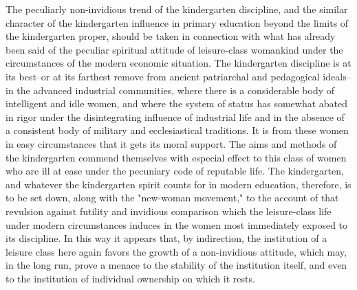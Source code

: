 \documentclass[12pt]{report}
\begin{document}
The peculiarly non-invidious trend of the kindergarten discipline, and
the similar character of the kindergarten influence in primary education
beyond the limits of the kindergarten proper, should be taken in
connection with what has already been said of the peculiar spiritual
attitude of leisure-class womankind under the circumstances of the
modern economic situation. The kindergarten discipline is at its
best--or at its farthest remove from ancient patriarchal and pedagogical
ideals--in the advanced industrial communities, where there is a
considerable body of intelligent and idle women, and where the system of
status has somewhat abated in rigor under the disintegrating influence
of industrial life and in the absence of a consistent body of
military and ecclesiastical traditions. It is from these women in easy
circumstances that it gets its moral support. The aims and methods of
the kindergarten commend themselves with especial effect to this class
of women who are ill at ease under the pecuniary code of reputable life.
The kindergarten, and whatever the kindergarten spirit counts for
in modern education, therefore, is to be set down, along with the
"new-woman movement," to the account of that revulsion against futility
and invidious comparison which the leisure-class life under modern
circumstances induces in the women most immediately exposed to its
discipline. In this way it appears that, by indirection, the institution
of a leisure class here again favors the growth of a non-invidious
attitude, which may, in the long run, prove a menace to the stability
of the institution itself, and even to the institution of individual
ownership on which it rests.
\end{document}
